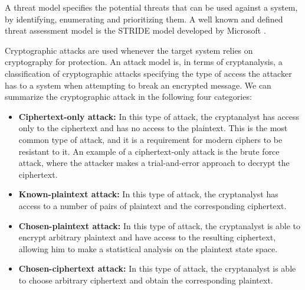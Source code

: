 A threat model specifies the potential threats that can be used against a system, by identifying, enumerating and prioritizing them. A well known and defined threat assessment model is the STRIDE model developed by Microsoft \cite{hafiz2007organizing}.

Cryptographic attacks are used whenever the target system relies on cryptography for protection. An attack model is, in terms of cryptanalysis, a classification of cryptographic attacks specifying the type of access the attacker has to a system when attempting to break an encrypted message. We can summarize the cryptographic attack in the following four categories:

 \begin{itemize}

    \item \textbf{Ciphertext-only attack:} In this type of attack, the cryptanalyst has access only to the ciphertext and has no access to the plaintext. This is the most common type of attack, and it is a requirement for modern ciphers to be resistant to it. An example of a ciphertext-only attack is the brute force attack, where the attacker makes a trial-and-error approach to decrypt the ciphertext.

    \item \textbf{Known-plaintext attack:} In this type of attack, the cryptanalyst has access to a number of pairs of plaintext and the corresponding ciphertext.

    \item \textbf{Chosen-plaintext attack:} In this type of attack, the cryptanalyst is able to encrypt arbitrary plaintext and have access to the resulting ciphertext, allowing him to make a statistical analysis on the plaintext state space.

    \item \textbf{Chosen-ciphertext attack:} In this type of attack, the cryptanalyst is able to choose arbitrary ciphertext and obtain the corresponding plaintext.
\end{itemize}



%

